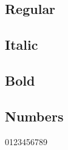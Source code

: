 \documentclass{article}
\begin{document}
\subsection*{Regular}
\lipsum[1]

\subsection*{Italic}
\textit{\lipsum[2]}

\subsection*{Bold}
\textbf{\lipsum[3]}

\subsection*{Numbers}
0123456789
\end{document}
